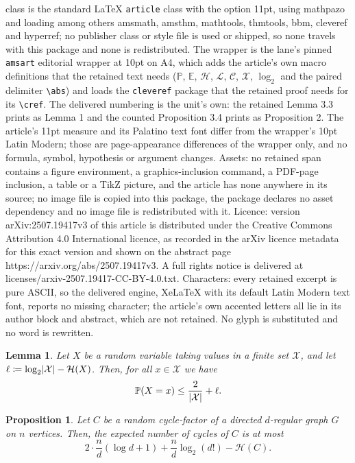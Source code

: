 \documentclass[10pt,a4paper]{amsart}
\newtheorem{lemma}[theorem]{Lemma}
\newtheorem{proposition}[theorem]{Proposition}
\newcommand{\pr}{\mathbb{P}}
\newcommand{\ev}{\mathbb{E}}
\newcommand{\ent}{\mathcal{H}}
\newcommand{\cL}{\mathcal L}
\newcommand{\C}{\mathcal C}
\newcommand{\X}{\mathcal X}
\newcommand{\logt}{\log_2}
\DeclarePairedDelimiter{\abs}{\lvert}{\rvert}
\begin{document}
class is the standard LaTeX \texttt{article} class with the option 11pt, using mathpazo and loading among others amsmath, amsthm, mathtools, thmtools, bbm, cleveref and hyperref; no publisher class or style file is used or shipped, so none travels with this package and none is redistributed. The wrapper is the lane's pinned \texttt{amsart} editorial wrapper at 10pt on A4, which adds the article's own macro definitions that the retained text needs ($\pr$, $\ev$, $\ent$, $\cL$, $\C$, $\X$, $\logt$ and the paired delimiter \texttt{\textbackslash abs}) and loads the \texttt{cleveref} package that the retained proof needs for its \texttt{\textbackslash cref}. The delivered numbering is the unit's own: the retained Lemma 3.3 prints as Lemma 1 and the counted Proposition 3.4 prints as Proposition 2. The article's 11pt measure and its Palatino text font differ from the wrapper's 10pt Latin Modern; those are page-appearance differences of the wrapper only, and no formula, symbol, hypothesis or argument changes. Assets: no retained span contains a figure environment, a graphics-inclusion command, a PDF-page inclusion, a table or a TikZ picture, and the article has none anywhere in its source; no image file is copied into this package, the package declares no asset dependency and no image file is redistributed with it. Licence: version arXiv:2507.19417v3 of this article is distributed under the Creative Commons Attribution 4.0 International licence, as recorded in the arXiv licence metadata for this exact version and shown on the abstract page https://arxiv.org/abs/2507.19417v3. A full rights notice is delivered at licenses/arxiv-2507.19417-CC-BY-4.0.txt. Characters: every retained excerpt is pure ASCII, so the delivered engine, XeLaTeX with its default Latin Modern text font, reports no missing character; the article's own accented letters all lie in its author block and abstract, which are not retained. No glyph is substituted and no word is rewritten.
\begin{lemma}\label{lem:entlossskew}
    Let $X$ be a random variable taking values in a finite set $\X$, and let $\ell \coloneqq \logt \abs{\X} - \ent(X)$. Then, for all $x \in \X$ we have
    \[
        \pr(X = x) \le \frac{2}{\abs{\X}} + \ell.
    \]
\end{lemma}

\begin{proposition}\label{prop:boundexpectednumberofcycles}
    Let $C$ be a random cycle-factor of a directed $d$-regular graph $G$ on $n$ vertices. Then, the expected number of cycles of $C$ is at most
    \[
        2 \cdot \frac{n}{d} (\log d + 1) + \frac{n}{d} \logt(d!) - \ent(C).
    \]
\end{proposition}
\end{document}
